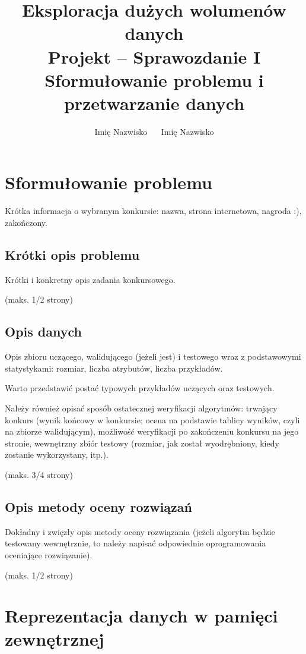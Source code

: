 \documentclass[a4paper,11pt]{article}
\author{Imię Nazwisko $\quad$ Imię Nazwisko}
\title{Eksploracja dużych wolumenów danych \\ 
\large{{\bf Projekt -- Sprawozdanie I} \\ Sformułowanie problemu i przetwarzanie danych}}
\begin{document}
\maketitle 

\section{Sformułowanie problemu}

Krótka informacja o wybranym konkursie: nazwa, strona internetowa, nagroda :), zakończony.

\subsection{Krótki opis problemu}

Krótki i konkretny opis zadania konkursowego.

(maks. 1/2 strony)

\subsection{Opis danych}

Opis zbioru uczącego, walidującego (jeżeli jest) i testowego wraz z podstawowymi statystykami: rozmiar, liczba atrybutów, liczba przykładów.

Warto przedstawić postać typowych przykładów uczących oraz testowych.

Należy również opisać sposób ostatecznej weryfikacji algorytmów: trwający konkurs (wynik końcowy w konkursie; ocena na podstawie tablicy wyników, czyli na zbiorze walidującym), możliwość weryfikacji po zakończeniu konkursu na jego stronie, wewnętrzny zbiór testowy (rozmiar, jak został wyodrębniony, kiedy zostanie wykorzystany, itp.).

(maks. 3/4 strony)


\subsection{Opis metody oceny rozwiązań}

Dokładny i zwięzły opis metody oceny rozwiązania (jeżeli algorytm będzie testowany wewnętrznie, to należy napisać odpowiednie oprogramowania oceniające rozwiązanie). 

(maks. 1/2 strony)


\section{Reprezentacja danych w pamięci zewnętrznej}
\end{document}
